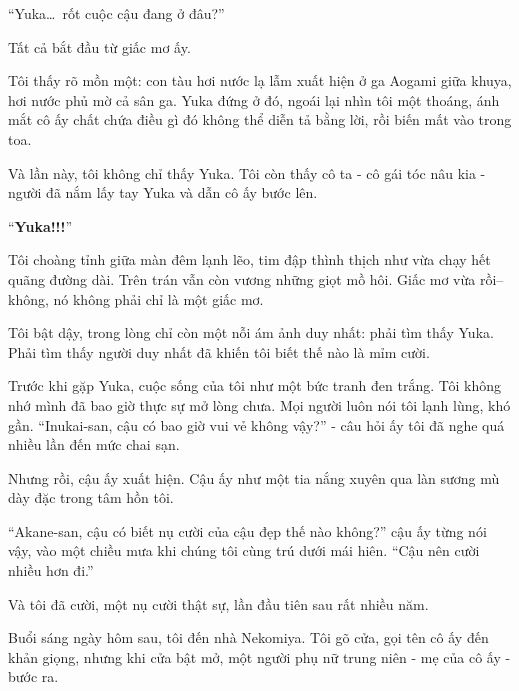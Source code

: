 \documentclass[../main.tex]{subfiles}
\begin{document}


``Yuka\dots\ rốt cuộc cậu đang ở đâu?''

Tất cả bắt đầu từ giấc mơ ấy.

Tôi thấy rõ mồn một: con tàu hơi nước lạ lẫm xuất hiện ở ga Aogami giữa khuya, hơi nước phủ mờ cả sân ga. Yuka đứng ở đó, ngoái lại nhìn tôi một thoáng, ánh mắt cô ấy chất chứa điều gì đó không thể diễn tả bằng lời, rồi biến mất vào trong toa.

Và lần này, tôi không chỉ thấy Yuka. Tôi còn thấy cô ta - cô gái tóc nâu kia - người đã nắm lấy tay Yuka và dẫn cô ấy bước lên.

``\textbf{Yuka!!!}''

Tôi choàng tỉnh giữa màn đêm lạnh lẽo, tim đập thình thịch như vừa chạy hết quãng đường dài. Trên trán vẫn còn vương những giọt mồ hôi. Giấc mơ vừa rồi-- không, nó không phải chỉ là một giấc mơ.

Tôi bật dậy, trong lòng chỉ còn một nỗi ám ảnh duy nhất: phải tìm thấy Yuka. Phải tìm thấy người duy nhất đã khiến tôi biết thế nào là mỉm cười.

Trước khi gặp Yuka, cuộc sống của tôi như một bức tranh đen trắng. Tôi không nhớ mình đã bao giờ thực sự mở lòng chưa. Mọi người luôn nói tôi lạnh lùng, khó gần. ``Inukai-san, cậu có bao giờ vui vẻ không vậy?'' - câu hỏi ấy tôi đã nghe quá nhiều lần đến mức chai sạn.

Nhưng rồi, cậu ấy xuất hiện. Cậu ấy như một tia nắng xuyên qua làn sương mù dày đặc trong tâm hồn tôi.

``Akane-san, cậu có biết nụ cười của cậu đẹp thế nào không?'' cậu ấy từng nói vậy, vào một chiều mưa khi chúng tôi cùng trú dưới mái hiên. ``Cậu nên cười nhiều hơn đi.''

Và tôi đã cười, một nụ cười thật sự, lần đầu tiên sau rất nhiều năm.

\ct

Buổi sáng ngày hôm sau, tôi đến nhà Nekomiya. Tôi gõ cửa, gọi tên cô ấy đến khản giọng, nhưng khi cửa bật mở, một người phụ nữ trung niên - mẹ của cô ấy - bước ra.
\end{document}
